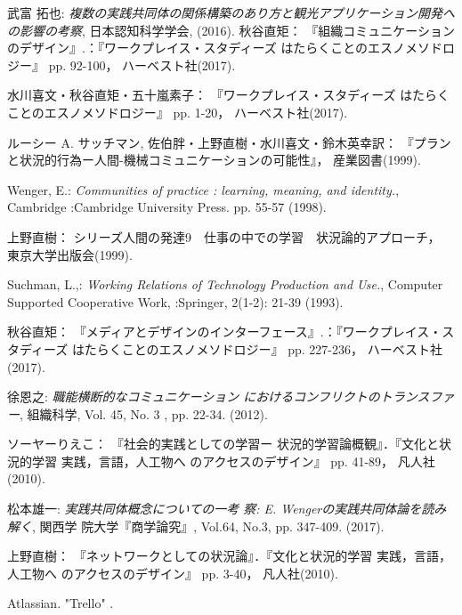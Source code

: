 \documentclass[submit,techrep]{ipsj}
\begin{document}
\begin{thebibliography}{9}


  武富 拓也: {\it 複数の実践共同体の関係構築のあり方と観光アプリケーション開発への影響の考察},
    日本認知科学学会,
    (2016).
  秋谷直矩：
  『組織コミュニケーションのデザイン』.：『ワークプレイス・スタディーズ はたらくことのエスノメソドロジー』 pp. 92-100，
  ハーベスト社(2017).

  水川喜文・秋谷直矩・五十嵐素子：
  『ワークプレイス・スタディーズ はたらくことのエスノメソドロジー』 pp. 1-20，
  ハーベスト社(2017).

ルーシー A. サッチマン, 佐伯胖・上野直樹・水川喜文・鈴木英幸訳：
『プランと状況的行為ー人間-機械コミュニケーションの可能性』，
産業図書(1999).

Wenger, E.: {\it Communities of practice : learning,
meaning, and identity.},
Cambridge :Cambridge University
Press. pp. 55-57 (1998).

上野直樹：
シリーズ人間の発達9　仕事の中での学習　状況論的アプローチ，
東京大学出版会(1999).

Suchman, L.,: {\it Working Relations of Technology Production and Use.},
Computer Supported Cooperative Work, :Springer,
2(1-2): 21-39 (1993).

  秋谷直矩：
  『メディアとデザインのインターフェース』.：『ワークプレイス・スタディーズ はたらくことのエスノメソドロジー』 pp. 227-236，
  ハーベスト社(2017).

  徐恩之: {\it 職能横断的なコミュニケーション
  におけるコンフリクトのトランスファー},
  組織科学,
  Vol. 45, No. 3 , pp. 22-34. (2012).

  ソーヤーりえこ：
  『社会的実践としての学習ー 状況的学習論概観』．『文化と状況的学習 実践，言語，人工物へ のアクセスのデザイン』 pp. 41-89，
  凡人社(2010).

  松本雄一: {\it 実践共同体概念についての一考 察: E. Wengerの実践共同体論を読み解く},
  関西学 院大学『商学論究』,
  Vol.64, No.3, pp. 347-409. (2017).

上野直樹：
『ネットワークとしての状況論』．『文化と状況的学習 実践，言語，人工物へ のアクセスのデザイン』 pp. 3-40，
凡人社(2010).

Atlassian.
"Trello"
%
.


\end{thebibliography}
\end{document}
